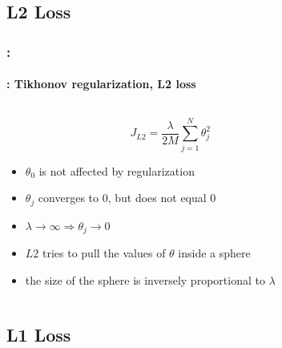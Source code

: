 \documentclass[xcolor=table]{beamer}%
\begin{document}
\subsection{L2 Loss}

\begin{frame}
	\frametitle{\insertshortsubtitle: \insertsection}
	\framesubtitle{\insertsubsection: Tikhonov regularization, L2 loss}
	
	\begin{columns}
		\begin{column}{.64\textwidth}
			\[J_{L2} = \frac{\lambda}{2M} \sum_{j=1}^{N} \theta_j^2\]
	
			\begin{itemize}
				\item $\theta_0$ is not affected by regularization
				\item $\theta_j$ converges to $0$, but does not equal $0$
				\item $\lambda \rightarrow \infty \Rightarrow \theta_j \rightarrow 0$
				\item $L2$ tries to pull the values of $\theta$ inside a sphere
				\item the size of the sphere is inversely proportional to $\lambda$
			\end{itemize}
		\end{column}
		\begin{column}{.35\textwidth}
		\end{column}
	\end{columns}
	
\end{frame}

\subsection{L1 Loss}
\end{document}
